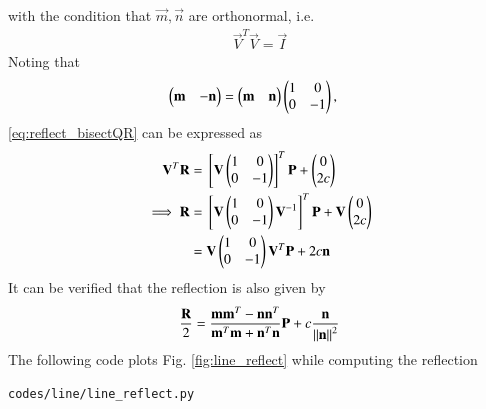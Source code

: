 \begin{enumerate}[label=\arabic*.,ref=\thesubsection.\theenumi]
with the condition that $\vec{m},\vec{n}$ are orthonormal, i.e.
\begin{align}
\label{eq:reflect_ortho}
\vec{V}^T\vec{V}=  \vec{I}
\end{align}
%
Noting that 
\begin{align}
\label{eq:reflect_trans}
\begin{pmatrix}\mathbf{m} & -\mathbf{n}\end{pmatrix} &= \begin{pmatrix}\mathbf{m} & \mathbf{n}\end{pmatrix} \begin{pmatrix}1 & 0 \\ 0 & -1\end{pmatrix},
\end{align}
\eqref{eq:reflect_bisectQR} can be expressed as
%
\begin{align}
\label{eq:reflect_}
\mathbf{V}^T\mathbf{R} &=  {}\left[\mathbf{V}\begin{pmatrix}1 & 0 \\ 0 & -1\end{pmatrix}\right]^T\mathbf{P}+\begin{pmatrix}0 \\ 2c\end{pmatrix}
\\
\implies \mathbf{R} &= {}\left[\mathbf{V}\begin{pmatrix}1 & 0 \\ 0 & -1\end{pmatrix}\mathbf{V}^{-1}\right]^T\mathbf{P}+ \mathbf{V}\begin{pmatrix}0 \\ 2c\end{pmatrix}
\\
 &=\mathbf{V}\begin{pmatrix}1 & 0 \\ 0 & -1\end{pmatrix}\mathbf{V}^T \mathbf{P}+2c \mathbf{n}
\end{align}
It can be verified that 
the reflection is also given by
\begin{align}
\frac{\mathbf{R}}{2} = \frac{\mathbf{m}\mathbf{m}^T-\mathbf{n}\mathbf{n}^T}{\mathbf{m}^T\mathbf{m}+\mathbf{n}^T\mathbf{n}}\mathbf{P} + c 
\frac{\mathbf{n}}{\left\lVert\mathbf{n}\right\rVert^2}
\end{align}
%
The following code plots Fig. \ref{fig:line_reflect} while computing the reflection
%
\begin{lstlisting}
codes/line/line_reflect.py
\end{lstlisting}
%
\begin{figure}[!ht]

\end{figure}
\end{enumerate}

